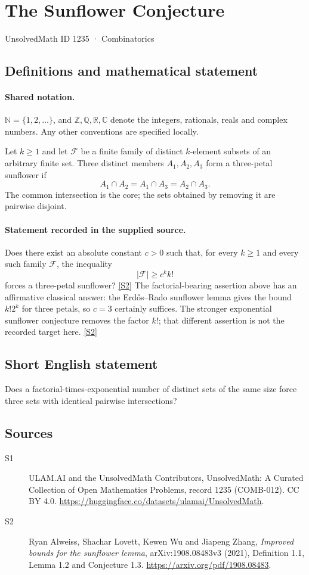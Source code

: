 \documentclass[11pt]{article}
\newcommand{\sref}[2]{\hyperlink{source:#1:#2}{[S#2]}}
\begin{document}
\setcounter{section}{1234}
\section{The Sunflower Conjecture}\label{1235}
{\small\sffamily UnsolvedMath ID 1235 · Combinatorics}
\subsection{Definitions and mathematical statement}

\paragraph{Shared notation.}$\mathbb N=\{1,2,\ldots\}$, and $\mathbb Z,\mathbb Q,\mathbb R,\mathbb C$ denote the integers, rationals, reals and complex numbers. Any other conventions are specified locally.


Let $k\geq1$ and let $\mathcal F$ be a finite family of distinct $k$-element subsets of an arbitrary finite set. Three distinct members $A_1,A_2,A_3$ form a three-petal sunflower if
\[
A_1\cap A_2=A_1\cap A_3=A_2\cap A_3.
\]
The common intersection is the core; the sets obtained by removing it are pairwise disjoint.
\paragraph{Statement recorded in the supplied source.}
Does there exist an absolute constant $c>0$ such that, for every $k\geq1$ and every such family $\mathcal F$, the inequality
\[
|\mathcal F|\geq c^k k!
\]
forces a three-petal sunflower? \sref{1235}{2}
The factorial-bearing assertion above has an affirmative classical answer: the Erd\H{o}s--Rado sunflower lemma gives the bound $k!2^k$ for three petals, so $c=3$ certainly suffices. The stronger exponential sunflower conjecture removes the factor $k!$; that different assertion is not the recorded target here. \sref{1235}{2}
\subsection{Short English statement}
Does a factorial-times-exponential number of distinct sets of the same size force three sets with identical pairwise intersections?
\subsection{Sources}
\begin{description}
\item[\hypertarget{source:1235:1}{S1}] ULAM.AI and the UnsolvedMath Contributors, UnsolvedMath: A Curated Collection of Open Mathematics Problems, record 1235 (COMB-012). CC BY 4.0. \url{https://huggingface.co/datasets/ulamai/UnsolvedMath}.
\item[\hypertarget{source:1235:2}{S2}] Ryan Alweiss, Shachar Lovett, Kewen Wu and Jiapeng Zhang, \emph{Improved bounds for the sunflower lemma}, arXiv:1908.08483v3 (2021), Definition 1.1, Lemma 1.2 and Conjecture 1.3. \url{https://arxiv.org/pdf/1908.08483}.
\end{description}
\label{end:1235}
\end{document}

